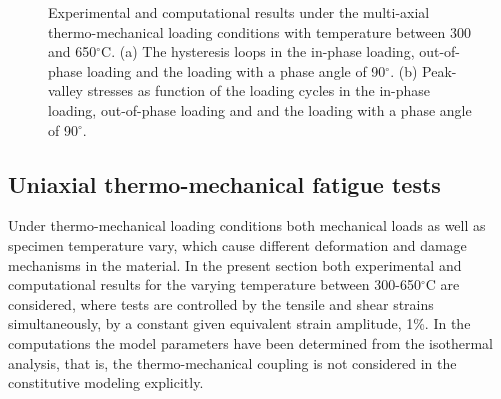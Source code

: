 \documentclass[preprint,5p,twocolumn,11pt,sort&compress]{elsarticle}
\begin{document}


\begin{figure*}
\caption{Experimental and computational results under the multi-axial thermo-mechanical loading conditions with temperature between 300 and 650$^{\circ}$C. (a) The hysteresis loops in the in-phase loading, out-of-phase loading and the loading with a phase angle of 90$^\circ$. (b) Peak-valley stresses as function of the loading cycles in the in-phase loading, out-of-phase loading and and the loading with a phase angle of 90$^\circ$.}
\label{Fig:TMF_IP}
\end{figure*}


\subsection{Uniaxial thermo-mechanical fatigue tests}
Under thermo-mechanical loading conditions both mechanical loads as well as specimen temperature vary, which cause different deformation and damage mechanisms in the material.
In the present section both experimental and computational results for the varying temperature between 300-650$^{\circ}$C are considered, where tests are controlled by the tensile and shear strains simultaneously, by a constant given equivalent strain amplitude, 1\%. In the computations the model parameters have been determined from the isothermal analysis, that is, the thermo-mechanical coupling is not considered in the constitutive modeling explicitly.
\end{document}
